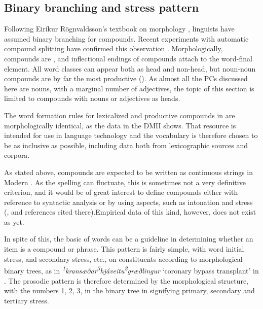 \documentclass[output=paper]{LSP/langsci}
\begin{document}
\subsection{Binary branching and stress pattern}\label{sec:bjarnadottir:2.1}

Following Eiríkur Rögnvaldsson’s textbook on  morphology \citep{Rögnvaldsson1986}, linguists have assumed binary branching for  compounds. Recent experiments with automatic compound splitting have confirmed this observation \citep{DaðasonEtAl2014}. Morphologically,  compounds are , and inflectional endings of compounds attach to the word-final element. All word classes can appear both as head and non-head, but noun-noun compounds are by far the most productive (\citealt{Bjarnadóttir19962005}). As almost all the PCs discussed here are nouns, with a marginal number of adjectives, the topic of this section is limited to compounds with nouns or adjectives as heads. 

The word formation rules for lexicalized and productive compounds in  are morphologically identical, as the data in the DMII shows. That resource is intended for use in language technology and the vocabulary is therefore chosen to be as inclusive as possible, including data both from lexicographic sources and corpora.

As stated above, compounds are expected to be written as continuous strings in Modern . As the spelling can fluctuate, this is sometimes not a very definitive criterion, and it would be of great interest to define compounds either with reference to syntactic analysis or by using  aspects, such as intonation and stress (\citealt{Árnason2011}, and references cited there).\largerpage Empirical data of this kind, however, does not exist as yet. 

In spite of this, the basic  of  words can be a guideline in determining whether an item is a compound or phrase. This pattern is fairly simple, with word initial stress, and secondary stress, etc., on constituents according to morphological binary trees, as in \textit{\textsuperscript{1}kransæðar\textsuperscript{3}hjáveitu\textsuperscript{2}græðlingur} ‘coronary bypass transplant’ in . The prosodic pattern is therefore determined by the morphological structure, with the numbers 1, 2, 3, in the binary tree in  signifying primary, secondary and tertiary stress.
\end{document}
